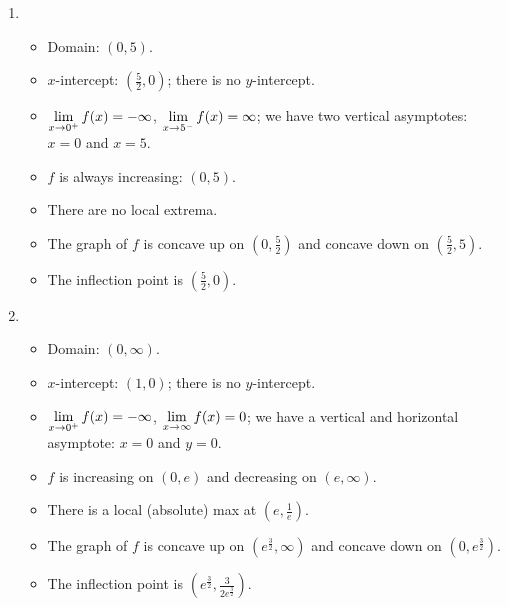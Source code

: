 \begin{enumerate}
\setcounter{enumi}{\value{HW}}

\addtocounter{enumi}{4}

\item  \begin{itemize}  \item  Domain:  $(0, 5)$.

\item $x$-intercept:  $\left( \frac{5}{2}, 0\right)$;  there is no $y$-intercept.

\item $\displaystyle{\lim_{x \rightarrow 0^{+}} f(x) = -\infty}$, $\displaystyle{\lim_{x \rightarrow 5^{-}} f(x) = \infty}$;  we have two vertical asymptotes:  $x = 0$ and $x = 5$.

\item  $f$ is always increasing: $(0, 5)$.

\item There are no local extrema.

\item  The graph of $f$ is concave up on $\left(0, \frac{5}{2}\right)$ and concave down on $\left( \frac{5}{2}, 5\right)$.

\item  The inflection point is $\left( \frac{5}{2}, 0\right)$.

\end{itemize}




\item   \begin{itemize}  \item  Domain:  $(0, \infty)$.

\item $x$-intercept:  $\left( 1 , 0\right)$;  there is no $y$-intercept.

\item $\displaystyle{\lim_{x \rightarrow 0^{+}} f(x) = -\infty}$, $\displaystyle{\lim_{x \rightarrow \infty} f(x) = 0}$;  we have a vertical and horizontal asymptote: $x = 0$ and  $y = 0$.

\item  $f$ is  increasing on  $(0, e)$ and decreasing on $(e, \infty)$.

\item  There is a local (absolute) max at $\left(e, \frac{1}{e}\right)$.

\item  The graph of $f$ is concave up on $\left(e^{\frac{3}{2}}, \infty \right)$ and concave down on $\left(0 ,  e^{\frac{3}{2}} \right)$.

\item  The inflection point is $\left( e^{\frac{3}{2}},  \frac{3}{2 e^{\frac{3}{2}}} \right)$.

\end{itemize}


\setcounter{HW}{\value{enumi}}
\end{enumerate}


